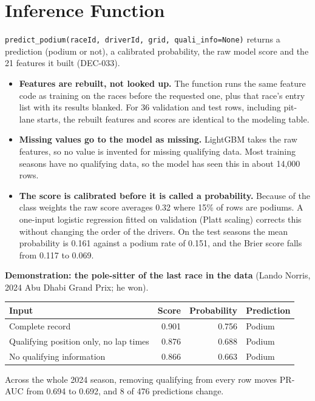\documentclass[11pt,a4paper]{article}
\begin{document}
\section{Inference Function}

\texttt{predict\_\allowbreak{}podium(raceId, driverId, grid, quali\_\allowbreak{}info=None)} returns a prediction (podium or not), a calibrated probability, the raw model score and the 21 features it built (DEC-033).

\begin{itemize}
\item \textbf{Features are rebuilt, not looked up.} The function runs the same feature code as training on the races before the requested one, plus that race's entry list with its results blanked. For 36 validation and test rows, including pit-lane starts, the rebuilt features and scores are identical to the modeling table.
\item \textbf{Missing values go to the model as missing.} LightGBM takes the raw features, so no value is invented for missing qualifying data. Most training seasons have no qualifying data, so the model has seen this in about 14,000 rows.
\item \textbf{The score is calibrated before it is called a probability.} Because of the class weights the raw score averages 0.32 where 15\% of rows are podiums. A one-input logistic regression fitted on validation (Platt scaling) corrects this without changing the order of the drivers. On the test seasons the mean probability is 0.161 against a podium rate of 0.151, and the Brier score falls from 0.117 to 0.069.
\end{itemize}

\textbf{Demonstration: the pole-sitter of the last race in the data} (Lando Norris, 2024 Abu Dhabi Grand Prix; he won).

{\small
\begin{xltabular}{\linewidth}{>{\raggedright\arraybackslash}Xrr>{\raggedright\arraybackslash}X}
\toprule
\textbf{Input} & \textbf{Score} & \textbf{Probability} & \textbf{Prediction} \\
\midrule
\endhead
Complete record & 0.901 & 0.756 & Podium \\
Qualifying position only, no lap times & 0.876 & 0.688 & Podium \\
No qualifying information & 0.866 & 0.663 & Podium \\
\bottomrule
\end{xltabular}
}

Across the whole 2024 season, removing qualifying from every row moves PR-AUC from 0.694 to 0.692, and 8 of 476 predictions change.
\end{document}

